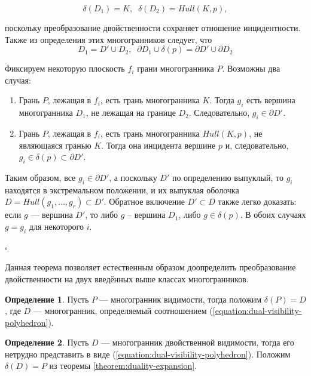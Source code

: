 \documentclass[a4paper, 10pt]{article}
\theoremstyle{definition}
\newtheorem{SmartDefinition}{Определение}
\theoremstyle{plain}
\theoremstyle{plain}
\begin{document}
\begin{equation*}
 \delta(D_{1}) = K, \;\; \delta(D_{2}) = Hull(K, p),
\end{equation*}

поскольку преобразование двойственности сохраняет отношение инцидентности.
Также из определения этих многогранников следует, что
\begin{equation*}
 D_{1} = D' \cup D_{2}, \;\;
 \partial D_{1} \cup \delta(p) = \partial D' \cup \partial D_{2}
\end{equation*}

Фиксируем некоторую плоскость $f_{i}$ грани многогранника $P$. Возможны два
случая:

\begin{enumerate}
 \item Грань $P$, лежащая в $f_{i}$, есть грань многогранника $K$. Тогда $g_{i}$
 есть вершина многогранника $D_{1}$, не лежащая на границе $D_{2}$.
 Следовательно, $g_{i} \in \partial D'$.
 \item Грань $P$, лежащая в $f_{i}$, есть грань многогранника $Hull(K, p)$, не
 являющаяся гранью $K$. Тогда она инцидента вершине $p$ и, следовательно,
 $g_{i} \in \delta(p) \subset \partial D'$.
\end{enumerate}

Таким образом, все $g_{i} \in \partial D'$, а поскольку $D'$ по определению
выпуклый, то $g_{i}$ находятся в экстремальном положении, и их выпуклая оболочка
$D = Hull(g_{1}, \ldots, g_{r}) \subset D'$. Обратное включение $D' \subset D$
также легко доказать: если $g$ --- вершина $D'$, то либо $g$ -- вершина $D_{1}$,
либо $g \in \delta(p)$. В обоих случаях $g = g_{i}$ для некоторого $i$.

$\square$

Данная теорема позволяет естественным образом доопределить преобразование
двойственности на двух введённых выше классах многогранников.

\begin{SmartDefinition}
 Пусть $P$ --- многогранник видимости, тогда положим $\delta(P) = D$, где $D$
 --- многогранник, определяемый соотношением
 (\ref{equation:dual-visibility-polyhedron}).
\end{SmartDefinition}
\begin{SmartDefinition}
 Пусть $D$ --- многогранник двойственной видимости, тогда его нетрудно
 представить в виде (\ref{equation:dual-visibility-polyhedron}). Положим
 $\delta(D) = P$ из теоремы \ref{theorem:duality-expansion}.
\end{SmartDefinition}
\end{document}
